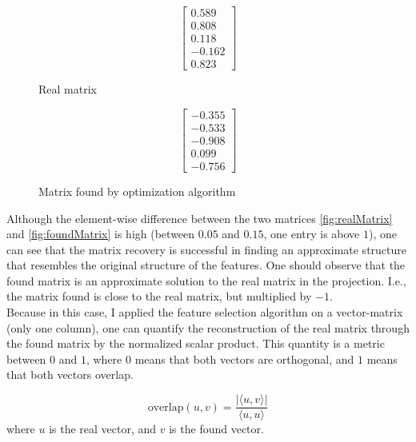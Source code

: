 \def\realW{
\begin{bmatrix}
    0.589 \\
    0.808 \\
    0.118 \\
    -0.162 \\
    0.823
\end{bmatrix}}

\def\okW1{
\begin{bmatrix}
    -0.355 \\
        -0.533 \\
        -0.908 \\
        0.099 \\
    -0.756 
\end{bmatrix}}

\begin{figure}[h] 
\begin {minipage}{0.47\textwidth}
  \centering
  \begin{equation} \label{fig:realMatrix}
    \realW
  \end{equation}
  \caption{Real matrix}
\end{minipage}
\hfill
\begin {minipage}{0.47\textwidth}
  \centering
  \begin{equation} \label{fig:foundMatrix}
    \okW1
  \end{equation}
  \caption{Matrix found by optimization algorithm}
\end{minipage}
\end{figure}

Although the element-wise difference between the two matrices \ref{fig:realMatrix} and \ref{fig:foundMatrix} is high (between $0.05$ and $0.15$, one entry is above $1$), one can see that the matrix recovery is successful in finding an approximate structure that resembles the original structure of the features.
One should observe that the found matrix is an approximate solution to the real matrix in the projection. I.e., the matrix found is close to the real matrix, but multiplied by $-1$. \\

Because in this case, I applied the feature selection algorithm on a vector-matrix (only one column), one can quantify the reconstruction of the real matrix through the found matrix by the normalized scalar product.
This quantity is a metric between $0$ and $1$, where $0$ means that both vectors are orthogonal, and $1$ means that both vectors overlap.

\begin{equation}
\text{overlap}(u, v) = \frac{| \langle u, v \rangle |}{\langle u, u \rangle}
\end{equation}
where $u$ is the real vector, and $v$ is the found vector.

